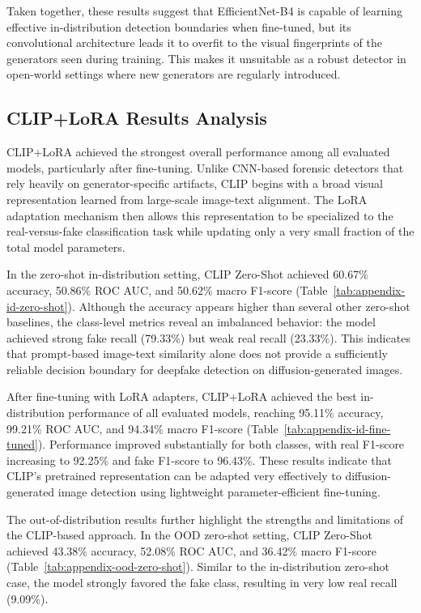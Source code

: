 Taken together, these results suggest that EfficientNet-B4 is capable of learning effective in-distribution detection boundaries when fine-tuned, but its convolutional architecture leads it to overfit to the visual fingerprints of the generators seen during training. This makes it unsuitable as a robust detector in open-world settings where new generators are regularly introduced.
 

\subsection{CLIP+LoRA Results Analysis}
CLIP+LoRA achieved the strongest overall performance among all evaluated models, particularly after fine-tuning. Unlike CNN-based forensic detectors that rely heavily on generator-specific artifacts, CLIP begins with a broad visual representation learned from large-scale image-text alignment. The LoRA adaptation mechanism then allows this representation to be specialized to the real-versus-fake classification task while updating only a very small fraction of the total model parameters.

In the zero-shot in-distribution setting, CLIP Zero-Shot achieved 60.67\% accuracy, 50.86\% ROC AUC, and 50.62\% macro F1-score (Table~\ref{tab:appendix-id-zero-shot}). Although the accuracy appears higher than several other zero-shot baselines, the class-level metrics reveal an imbalanced behavior: the model achieved strong fake recall (79.33\%) but weak real recall (23.33\%). This indicates that prompt-based image-text similarity alone does not provide a sufficiently reliable decision boundary for deepfake detection on diffusion-generated images.

After fine-tuning with LoRA adapters, CLIP+LoRA achieved the best in-distribution performance of all evaluated models, reaching 95.11\% accuracy, 99.21\% ROC AUC, and 94.34\% macro F1-score (Table~\ref{tab:appendix-id-fine-tuned}). Performance improved substantially for both classes, with real F1-score increasing to 92.25\% and fake F1-score to 96.43\%. These results indicate that CLIP's pretrained representation can be adapted very effectively to diffusion-generated image detection using lightweight parameter-efficient fine-tuning.

The out-of-distribution results further highlight the strengths and limitations of the CLIP-based approach. In the OOD zero-shot setting, CLIP Zero-Shot achieved 43.38\% accuracy, 52.08\% ROC AUC, and 36.42\% macro F1-score (Table~\ref{tab:appendix-ood-zero-shot}). Similar to the in-distribution zero-shot case, the model strongly favored the fake class, resulting in very low real recall (9.09\%).

